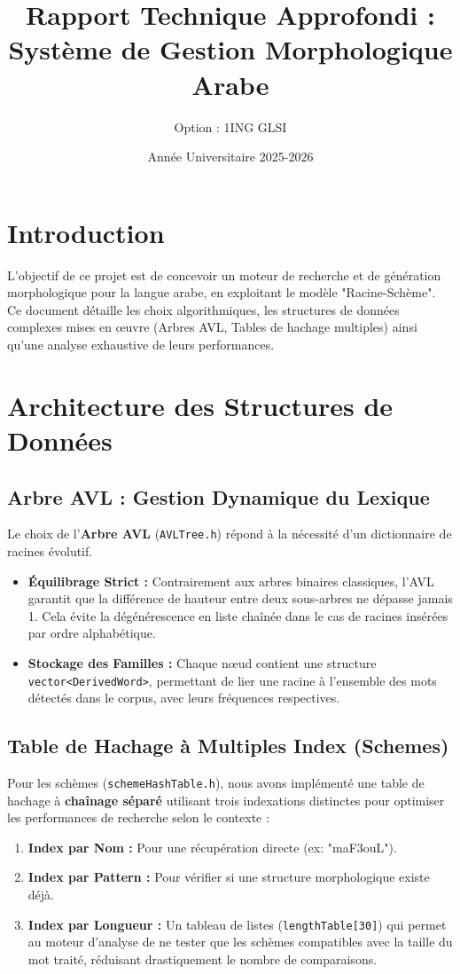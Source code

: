\documentclass[12pt,a4paper]{article}
\title{Rapport Technique Approfondi : Système de Gestion Morphologique Arabe}
\author{Option : 1ING GLSI}
\date{Année Universitaire 2025-2026}
\begin{document}
\maketitle

\section{Introduction}
L'objectif de ce projet est de concevoir un moteur de recherche et de génération morphologique pour la langue arabe, en exploitant le modèle "Racine-Schème". Ce document détaille les choix algorithmiques, les structures de données complexes mises en œuvre (Arbres AVL, Tables de hachage multiples) ainsi qu'une analyse exhaustive de leurs performances.

\section{Architecture des Structures de Données}

\subsection{Arbre AVL : Gestion Dynamique du Lexique}
Le choix de l'\textbf{Arbre AVL} (\texttt{AVLTree.h}) répond à la nécessité d'un dictionnaire de racines évolutif.
\begin{itemize}
	\item \textbf{Équilibrage Strict :} Contrairement aux arbres binaires classiques, l'AVL garantit que la différence de hauteur entre deux sous-arbres ne dépasse jamais 1. Cela évite la dégénérescence en liste chaînée dans le cas de racines insérées par ordre alphabétique.
	\item \textbf{Stockage des Familles :} Chaque nœud contient une structure \texttt{vector<DerivedWord>}, permettant de lier une racine à l'ensemble des mots détectés dans le corpus, avec leurs fréquences respectives.
\end{itemize}



\subsection{Table de Hachage à Multiples Index (Schemes)}
Pour les schèmes (\texttt{schemeHashTable.h}), nous avons implémenté une table de hachage à \textbf{chaînage séparé} utilisant trois indexations distinctes pour optimiser les performances de recherche selon le contexte :
\begin{enumerate}
	\item \textbf{Index par Nom :} Pour une récupération directe (ex: "maF3ouL").
	\item \textbf{Index par Pattern :} Pour vérifier si une structure morphologique existe déjà.
	\item \textbf{Index par Longueur :} Un tableau de listes (\texttt{lengthTable[30]}) qui permet au moteur d'analyse de ne tester que les schèmes compatibles avec la taille du mot traité, réduisant drastiquement le nombre de comparaisons.
\end{enumerate}
\end{document}
